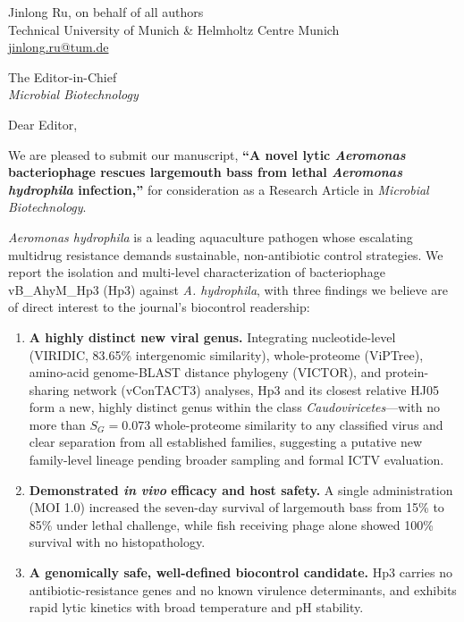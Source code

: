 \documentclass[11pt,a4paper]{article}
\begin{document}
\noindent Jinlong Ru, on behalf of all authors\\
Technical University of Munich \& Helmholtz Centre Munich\\
\href{mailto:jinlong.ru@tum.de}{jinlong.ru@tum.de}

\bigskip
\noindent The Editor-in-Chief\\
\emph{Microbial Biotechnology}

\bigskip
\noindent Dear Editor,

We are pleased to submit our manuscript, \textbf{``A novel lytic
\emph{Aeromonas} bacteriophage rescues largemouth bass from lethal
\emph{Aeromonas hydrophila} infection,''} for consideration as a Research
Article in \emph{Microbial Biotechnology}.

\emph{Aeromonas hydrophila} is a leading aquaculture pathogen whose escalating
multidrug resistance demands sustainable, non-antibiotic control strategies.
We report the isolation and multi-level characterization of bacteriophage
vB\_AhyM\_Hp3 (Hp3) against \emph{A. hydrophila}, with three findings we
believe are of direct interest to the journal's biocontrol readership:

\begin{enumerate}
\item \textbf{A highly distinct new viral genus.} Integrating nucleotide-level
(VIRIDIC, 83.65\% intergenomic similarity), whole-proteome (ViPTree),
amino-acid genome-BLAST distance phylogeny (VICTOR), and protein-sharing
network (vConTACT3) analyses, Hp3 and its closest relative HJ05 form a new,
highly distinct genus within the class \emph{Caudoviricetes}---with no more
than $S_G = 0.073$ whole-proteome similarity to any classified virus and clear
separation from all established families, suggesting a putative new
family-level lineage pending broader sampling and formal ICTV evaluation.

\item \textbf{Demonstrated \emph{in vivo} efficacy and host safety.} A single
administration (MOI 1.0) increased the seven-day survival of largemouth bass
from 15\% to 85\% under lethal challenge, while fish receiving phage alone
showed 100\% survival with no histopathology.

\item \textbf{A genomically safe, well-defined biocontrol candidate.} Hp3
carries no antibiotic-resistance genes and no known virulence
determinants, and exhibits rapid lytic kinetics with broad temperature and pH
stability.

\end{enumerate}
\end{document}
